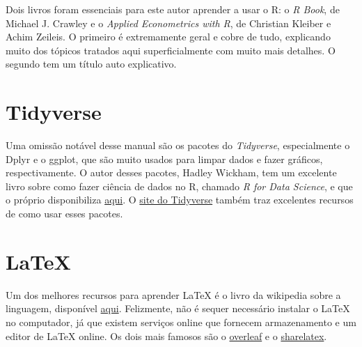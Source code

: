 \documentclass[
]{book}
\begin{document}
Dois livros foram essenciais para este autor aprender a usar o R: o \emph{R Book}, de Michael J. Crawley e o \emph{Applied Econometrics with R}, de Christian Kleiber e Achim Zeileis. O primeiro é extremamente geral e cobre de tudo, explicando muito dos tópicos tratados aqui superficialmente com muito mais detalhes. O segundo tem um título auto explicativo.

\hypertarget{tidyverse}{%
\section{Tidyverse}\label{tidyverse}}

Uma omissão notável desse manual são os pacotes do \emph{Tidyverse}, especialmente o Dplyr e o ggplot, que são muito usados para limpar dados e fazer gráficos, respectivamente. O autor desses pacotes, Hadley Wickham, tem um excelente livro sobre como fazer ciência de dados no R, chamado \emph{R for Data Science}, e que o próprio disponibiliza \href{http://r4ds.had.co.nz/}{aqui}. O \href{https://www.tidyverse.org/}{site do Tidyverse} também traz excelentes recursos de como usar esses pacotes.

\hypertarget{latex}{%
\section{LaTeX}\label{latex}}

Um dos melhores recursos para aprender LaTeX é o livro da wikipedia sobre a linguagem, disponível \href{https://en.wikibooks.org/wiki/LaTeX}{aqui}. Felizmente, não é sequer necessário instalar o LaTeX no computador, já que existem serviços online que fornecem armazenamento e um editor de LaTeX online. Os dois mais famosos são o \href{https://www.overleaf.com/}{overleaf} e o \href{https://pt.sharelatex.com/}{sharelatex}.
\end{document}

